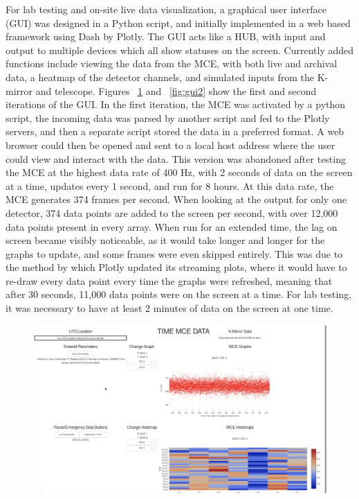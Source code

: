 \documentclass[manuscript]{aastex}
\begin{document}
For lab testing and on-site live data visualization, a graphical user interface (GUI) was designed in a {\sc Python} script, and initially implemented in a web based framework using {\sc Dash by Plotly}. The GUI acts like a HUB, with input and output to multiple devices which all show statuses on the screen. Currently added functions include viewing the data from the MCE, with both live and archival data, a heatmap of the detector channels, and simulated inputs from the K-mirror and telescope. Figures ~\ref{fig:gui1} and ~\ref{fig:gui2} show the first and second iterations of the GUI. In the first iteration, the MCE was activated by a python script, the incoming data was parsed by another script and fed to the Plotly servers, and then a separate script stored the data in a preferred format. A web browser could then be opened and sent to a local host address where the user could view and interact with the data. This version was abandoned after testing the MCE at the highest data rate of 400 Hz, with 2 seconds of data on the screen at a time, updates every 1 second, and run for 8 hours. At this data rate, the MCE generates 374 frames per second. When looking at the output for only one detector, 374 data points are added to the screen per second, with over 12,000 data points present in every array. When run for an extended time, the lag on screen became visibly noticeable, as it would take longer and longer for the graphs to update, and some frames were even skipped entirely. This was due to the method by which Plotly updated its streaming plots, where it would have to re-draw every data point every time the graphs were refreshed, meaning that after 30 seconds, 11,000 data points were on the screen at a time. For lab testing, it was necessary to have at least 2 minutes of data on the screen at one time.

\begin{figure}[ht!]
	\centering
	\includegraphics[width=\textwidth]{gui1.png}%
	\caption[GUI Beta 1.0]{}%
	\label{fig:gui1}%
\end{figure}
\end{document}
